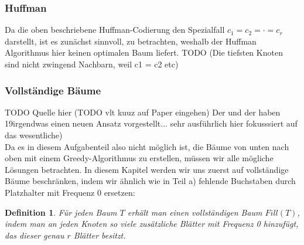 \documentclass[a4paper,10pt,ngerman]{scrartcl}
\newtheorem{definition}[satz]{Definition}
\begin{document}
    \subsubsection{Huffman}
    Da die oben beschriebene Huffman-Codierung den Spezialfall $c_1 = c_2 = \cdot = c_r$ darstellt, ist es zunächst sinnvoll, zu betrachten, weshalb der Huffman Algorithmus hier keinen optimalen Baum liefert.
    TODO (Die tiefsten Knoten sind nicht zwingend Nachbarn, weil c1 = c2 etc)

    \subsubsection{Vollständige Bäume}
    TODO Quelle hier (TODO vlt kuuz auf Paper eingehen) Der und der haben 19irgendwas einen neuen Ansatz vorgestellt... sehr ausführlich hier fokusssiert auf das wesentliche) \\
    Da es in diesem Aufgabenteil also nicht möglich ist, die Bäume von unten nach oben mit einem Greedy-Algorithmus zu erstellen, müssen wir alle mögliche Lösungen betrachten.
    In diesem Kapitel werden wir uns zuerst auf vollständige Bäume beschränken, indem wir ähnlich wie in Teil a) fehlende Buchstaben durch Platzhalter mit Frequenz 0 ersetzen:
    \begin{definition}
        Für jeden Baum $T$ erhält man einen vollständigen Baum $Fill(T)$, indem man an jeden Knoten so viele zusätzliche Blätter mit Frequenz 0 hinzufügt, das dieser genau $r$ Blätter besitzt.
    \end{definition}
\end{document}
